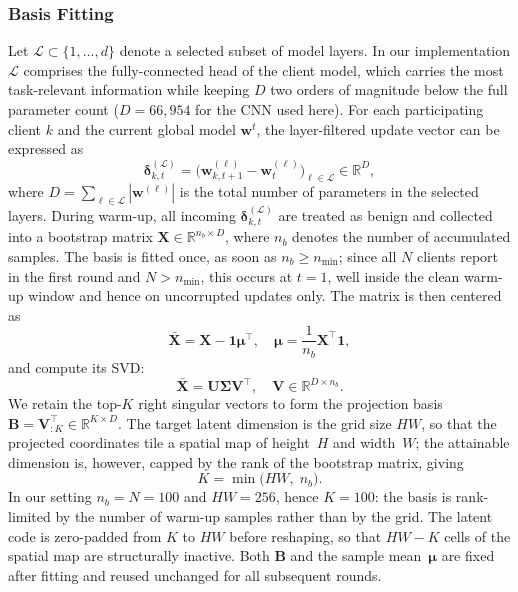\documentclass[journal]{IEEEtran}
\begin{document}
\subsubsection{Basis Fitting}
Let $\mathcal{L} \subset \{1, \ldots, d\}$ denote a selected subset of model layers. In our implementation $\mathcal{L}$ comprises the fully-connected head of the client model, which carries the most task-relevant information while keeping $D$ two orders of magnitude below the full parameter count ($D = 66{,}954$ for the CNN used here). For each participating client $k$ and the current global model $\mathbf{w}^t$, the layer-filtered update vector can be expressed as
\begin{equation}
\boldsymbol{\delta}_{k,t}^{(\mathcal{L})} = \bigl(\mathbf{w}_{k,t+1}^{(\ell)} - \mathbf{w}_t^{(\ell)}\bigr)_{\ell \in \mathcal{L}} \in \mathbb{R}^D,
\label{eq:layer_update}
\end{equation}
where $D = \sum_{\ell \in \mathcal{L}} |\mathbf{w}^{(\ell)}|$ is the total number of parameters in the selected layers. During warm-up, all incoming $\boldsymbol{\delta}_{k,t}^{(\mathcal{L})}$ are treated as benign and collected into a bootstrap matrix $\mathbf{X} \in \mathbb{R}^{n_b \times D}$, where $n_b$ denotes the number of accumulated samples. The basis is fitted once, as soon as $n_b \geq n_{\min}$; since all $N$ clients report in the first round and $N > n_{\min}$, this occurs at $t = 1$, well inside the clean warm-up window and hence on uncorrupted updates only. The matrix is then centered as
\begin{equation}
\bar{\mathbf{X}} = \mathbf{X} - \mathbf{1}\boldsymbol{\mu}^\top, \quad \boldsymbol{\mu} = \frac{1}{n_b} \mathbf{X}^\top \mathbf{1},
\label{eq:centering}
\end{equation}
and compute its SVD:
\begin{equation}
\bar{\mathbf{X}} = \mathbf{U} \boldsymbol{\Sigma} \mathbf{V}^\top, \quad \mathbf{V} \in \mathbb{R}^{D \times n_b}.
\label{eq:svd}
\end{equation}
We retain the top-$K$ right singular vectors to form the projection basis $\mathbf{B} = \mathbf{V}_{:K}^\top \in \mathbb{R}^{K \times D}$. The target latent dimension is the grid size $HW$, so that the projected coordinates tile a spatial map of height~$H$ and width~$W$; the attainable dimension is, however, capped by the rank of the bootstrap matrix, giving
\begin{equation}
K = \min\bigl(HW,\; n_b\bigr).
\label{eq:latent_dim}
\end{equation}
In our setting $n_b = N = 100$ and $HW = 256$, hence $K = 100$: the basis is rank-limited by the number of warm-up samples rather than by the grid. The latent code is zero-padded from $K$ to $HW$ before reshaping, so that $HW - K$ cells of the spatial map are structurally inactive. Both $\mathbf{B}$ and the sample mean~$\boldsymbol{\mu}$ are fixed after fitting and reused unchanged for all subsequent rounds.
\end{document}
